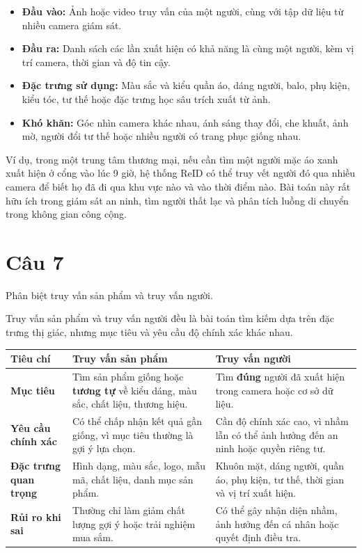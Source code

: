 \begin{itemize}
    \item \textbf{Đầu vào:} Ảnh hoặc video truy vấn của một người, cùng với tập dữ liệu từ nhiều camera giám sát.

    \item \textbf{Đầu ra:} Danh sách các lần xuất hiện có khả năng là cùng một người, kèm vị trí camera, thời gian và độ tin cậy.

    \item \textbf{Đặc trưng sử dụng:} Màu sắc và kiểu quần áo, dáng người, balo, phụ kiện, kiểu tóc, tư thế hoặc đặc trưng học sâu trích xuất từ ảnh.

    \item \textbf{Khó khăn:} Góc nhìn camera khác nhau, ánh sáng thay đổi, che khuất, ảnh mờ, người đổi tư thế hoặc nhiều người có trang phục giống nhau.
\end{itemize}

Ví dụ, trong một trung tâm thương mại, nếu cần tìm một người mặc áo xanh xuất hiện ở cổng vào lúc 9 giờ, hệ thống ReID có thể truy vết người đó qua nhiều camera để biết họ đã đi qua khu vực nào và vào thời điểm nào. Bài toán này rất hữu ích trong giám sát an ninh, tìm người thất lạc và phân tích luồng di chuyển trong không gian công cộng.


\section*{Câu 7}
Phân biệt truy vấn sản phẩm và truy vấn người.

Truy vấn sản phẩm và truy vấn người đều là bài toán tìm kiếm dựa trên đặc trưng thị giác, nhưng mục tiêu và yêu cầu độ chính xác khác nhau.

\small
\begin{longtable}{|p{}|p{}|p{}|}
\hline
\textbf{Tiêu chí} & \textbf{Truy vấn sản phẩm} & \textbf{Truy vấn người} \\
\hline
\textbf{Mục tiêu} & Tìm sản phẩm giống hoặc \textbf{tương tự} về kiểu dáng, màu sắc, chất liệu, thương hiệu. & Tìm \textbf{đúng} người đã xuất hiện trong camera hoặc cơ sở dữ liệu. \\
\hline
\textbf{Yêu cầu chính xác} & Có thể chấp nhận kết quả gần giống, vì mục tiêu thường là gợi ý lựa chọn. & Cần độ chính xác cao, vì nhầm lẫn có thể ảnh hưởng đến an ninh hoặc quyền riêng tư. \\
\hline
\textbf{Đặc trưng quan trọng} & Hình dạng, màu sắc, logo, mẫu mã, chất liệu, danh mục sản phẩm. & Khuôn mặt, dáng người, quần áo, phụ kiện, tư thế, thời gian và vị trí xuất hiện. \\
\hline
\textbf{Rủi ro khi sai} & Thường chỉ làm giảm chất lượng gợi ý hoặc trải nghiệm mua sắm. & Có thể gây nhận diện nhầm, ảnh hưởng đến cá nhân hoặc quyết định điều tra. \\
\hline
\end{longtable}
\normalsize


